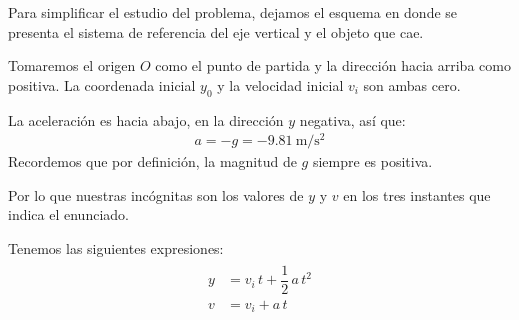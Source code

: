 \documentclass[14pt]{extarticle}
\begin{document}
Para simplificar el estudio del problema, dejamos el esquema en donde se presenta el sistema de referencia del eje vertical y el objeto que cae.
\begin{figure}[H]
\centering
{}        
\end{figure}

Tomaremos el origen $O$ como el punto de partida y la dirección hacia arriba como positiva. La coordenada inicial $y_{0}$ y la velocidad inicial $v_{i}$ son ambas cero.

La aceleración es hacia abajo, en la dirección $y$ negativa,  así que:
\begin{align*}
a = - g = - \SI{9.81}{\meter\per\square\second}
\end{align*}
Recordemos que por definición, la magnitud de $g$ siempre es positiva.

Por lo que nuestras incógnitas son los valores de $y$ y $v$ en los tres instantes que indica el enunciado.

Tenemos las siguientes expresiones:
\begin{eqnarray*}
\begin{aligned}
y &= v_{i} \, t + \dfrac{1}{2} \, a \, t^{2} \\[0.5em] 
v &= v_{i} + a \, t 
\end{aligned}
\end{eqnarray*}
\end{document}
